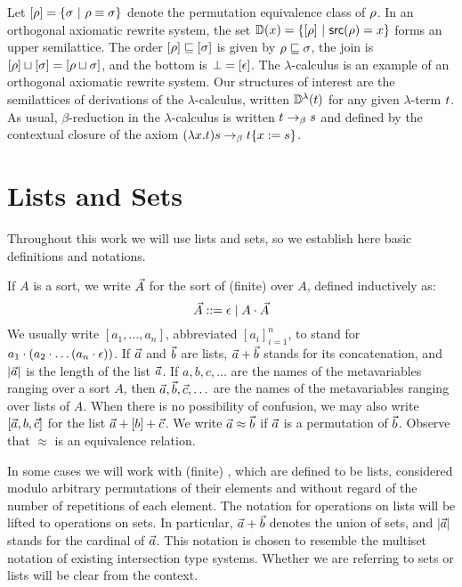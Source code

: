 Let ${[\rho]} = \{\sigma \ |\  \rho \equiv \sigma\}$
denote the permutation equivalence class of $\rho$.
In an orthogonal axiomatic rewrite system,
the set $\mathbb{D}(x) = \{{[\rho]} \ |\  \mathsf{src}(\rho) = x\}$
forms an upper semilattice.
The order ${[\rho]} \sqsubseteq {[\sigma]}$ is given by $\rho \sqsubseteq \sigma$,
the join is ${[\rho]} \sqcup {[\sigma]} = {[\rho \sqcup \sigma]}$,
and the bottom is $\bot = {[\epsilon]}$.
The $\lambda$-calculus is an example of an orthogonal axiomatic rewrite system.
Our structures of interest are the semilattices of derivations of the $\lambda$-calculus,
written $\mathbb{D}^{\lambda}(t)$ for any given $\lambda$-term $t$.
As usual, $\beta$-reduction in the $\lambda$-calculus
is written $t \mathrel{\to_\beta} s$
and defined by the contextual closure of the axiom $(\lambda x. t)s \mathrel{\to_\beta} t\{x := s\}$.


\section{Lists and Sets}

Throughout this work we will use lists and sets, so we establish here basic definitions and notations.

\begin{definition}
If $A$ is a sort, we write $\vec{A}$ for the sort of (finite)  over $A$,
defined inductively as:
\[
  \vec{A} ::= \epsilon \mid A \cdot \vec{A}
  \]
We usually write $[a_1, \hdots, a_n]$,
abbreviated $[a_i]_{i=1}^{n}$,
to stand for $a_1 \cdot (a_2 \cdot \hdots (a_n \cdot \epsilon))$.
If $\vec{a}$ and $\vec{b}$ are lists, $\vec{a} + \vec{b}$ stands for its concatenation,
and $|\vec{a}|$ is the length of the list $\vec{a}$.
If $a,b,c,\hdots$ are the names of the metavariables ranging over a sort $A$,
then $\vec{a},\vec{b},\vec{c},\hdots$
are the names of the metavariables ranging over lists of $A$.
When there is no possibility of confusion, we may also write $[\vec{a},b,\vec{c}]$
for the list $\vec{a} + [b] + \vec{c}$.
We write $\vec{a} \approx \vec{b}$ if $\vec{a}$ is a permutation of $\vec{b}$.
Observe that $\approx$ is an equivalence relation.

In some cases we will work with (finite) ,
which are defined to be lists,
considered modulo arbitrary permutations of their elements
and without regard of the number of repetitions of each element.
The notation for operations on lists will be lifted to operations
on sets.
In particular, $\vec{a} + \vec{b}$ denotes the union of sets,
and $|\vec{a}|$ stands for the cardinal of $\vec{a}$.
This notation is chosen to resemble the multiset notation of existing
intersection type systems. Whether we are referring to sets or lists will be
clear from the context.
\end{definition}




